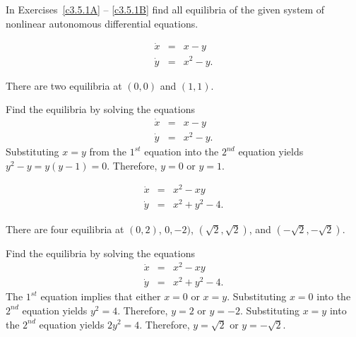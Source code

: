 \documentclass{ximera}
\begin{document}
\noindent In Exercises~\ref{c3.5.1A} -- \ref{c3.5.1B} find all equilibria of
the given system of nonlinear autonomous differential equations.
\begin{exercise}  \label{c3.5.1A}
\begin{eqnarray*}
\dot{x} & = & x - y\\
\dot{y} & = & x^2 - y.
\end{eqnarray*}

\begin{solution}
\ans There are two equilibria at $(0,0)$ and $(1,1)$.

\soln Find the equilibria by solving the equations
\begin{eqnarray*}
\dot{x} & = & x-y\\
\dot{y} & = & x^2-y.
\end{eqnarray*}
Substituting $x=y$ from the $1^{st}$ equation into the $2^{nd}$ equation
yields $y^2-y = y(y-1)=0$.  Therefore, $y=0$ or $y=1$.



\end{solution}
\end{exercise}
\begin{exercise}  \label{c3.5.1B}
\begin{eqnarray*}
\dot{x} & = & x^2 - xy\\
\dot{y} & = & x^2 + y^2 - 4.
\end{eqnarray*}

\begin{solution}
\ans There are four equilibria at $(0,2)$, $0,-2)$, 
$(\sqrt{2},\sqrt{2})$, and $(-\sqrt{2},-\sqrt{2})$.

\soln Find the equilibria by solving the equations
\begin{eqnarray*}
\dot{x} & = & x^2-xy\\
\dot{y} & = & x^2+y^2-4.
\end{eqnarray*}
The $1^{st}$ equation implies that either $x=0$ or $x=y$.  Substituting
$x=0$ into the $2^{nd}$ equation yields $y^2=4$.  Therefore, $y=2$ or $y=-2$.
Substituting $x=y$ into the $2^{nd}$ equation yields $2y^2=4$. Therefore, 
$y = \sqrt{2}$ or $y = -\sqrt{2}$.


\end{solution}
\end{exercise}
\end{document}
